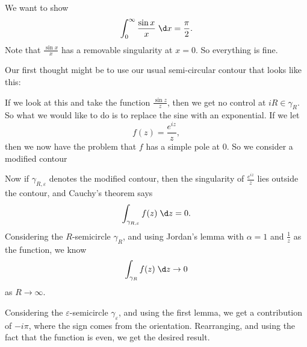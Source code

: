 \documentclass[a4paper]{article}
\begin{document}
\begin{eg}
  We want to show
  \[
    \int_0^\infty \frac{\sin x}{x}\;\d x = \frac{\pi}{2}.
  \]
  Note that $\frac{\sin x}{x}$ has a removable singularity at $x = 0$. So everything is fine.

  Our first thought might be to use our usual semi-circular contour that looks like this:
  \begin{center}
  \end{center}
  If we look at this and take the function $\frac{\sin z}{z}$, then we get no control at $iR \in \gamma_R$. So what we would like to do is to replace the sine with an exponential. If we let
  \[
    f(z) = \frac{e^{iz}}{z},
  \]
  then we now have the problem that $f$ has a simple pole at $0$. So we consider a modified contour
  \begin{center}
  \end{center}
  Now if $\gamma_{R, \varepsilon}$ denotes the modified contour, then the singularity of $\frac{e^{iz}}{z}$ lies outside the contour, and Cauchy's theorem says
  \[
    \int_{\gamma_{R, \varepsilon}} f(z)\;\d z = 0.
  \]
  Considering the $R$-semicircle $\gamma_R$, and using Jordan's lemma with $\alpha = 1$ and $\frac{1}{z}$ as the function, we know
  \[
    \int_{\gamma_R} f(z) \;\d z \to 0
  \]
  as $R \to \infty$.

  Considering the $\varepsilon$-semicircle $\gamma_\varepsilon$, and using the first lemma, we get a contribution of $-i \pi$, where the sign comes from the orientation. Rearranging, and using the fact that the function is even, we get the desired result.
\end{eg}
\end{document}
